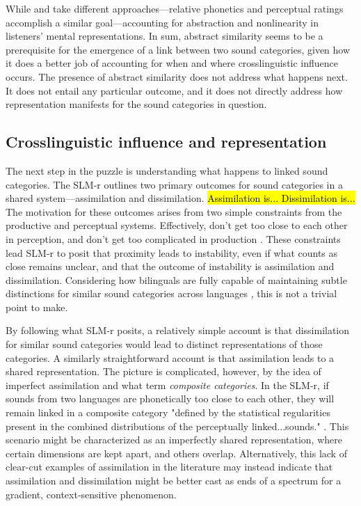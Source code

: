 While \citet{flege_2021_slmr} and \citet{chang_2015_similarity} take different approaches---relative phonetics and perceptual ratings accomplish a similar goal---accounting for abstraction and nonlinearity in listeners' mental representations. In sum, abstract similarity seems to be a prerequisite for the emergence of a link between two sound categories, given how it does a better job of accounting for when and where crosslinguistic influence occurs. The presence of abstract similarity does not address what happens next. It does not entail any particular outcome, and it does not directly address how representation manifests for the sound categories in question. 

\subsection{Crosslinguistic influence and representation}\label{ch4:sec:cli}

The next step in the puzzle is understanding what happens to linked sound categories. The SLM-r outlines two primary outcomes for sound categories in a shared system---assimilation and dissimilation. \hl{Assimilation is... Dissimilation is...} The motivation for these outcomes arises from two simple constraints from the productive and perceptual systems. Effectively, don't get too close to each other in perception, and don't get too complicated in production \citep{guion_2003_systems, lindblom_1988_universals, flege_2021_slmr}. These constraints lead SLM-r to posit that proximity leads to instability, even if what counts as close remains unclear, and that the outcome of instability is assimilation and dissimilation. Considering how bilinguals are fully capable of maintaining subtle distinctions for similar sound categories across languages \citep[e.g.,][]{sundara_2006_production, casillas_2021_interlingual}, this is not a trivial point to make. %

By following what SLM-r posits, a relatively simple account is that dissimilation for similar sound categories would lead to distinct representations of those categories. A similarly straightforward account is that assimilation leads to a shared representation. The picture is complicated, however, by the idea of imperfect assimilation and what \citeauthor{flege_2021_slmr} term \textit{composite categories}. In the SLM-r, if sounds from two languages are phonetically too close to each other, they will remain linked in a composite category "defined by the statistical regularities present in the combined distributions of the perceptually linked...sounds." \citep[][p. 41]{flege_2021_slmr}. This scenario might be characterized as an imperfectly shared representation, where certain dimensions are kept apart, and others overlap. Alternatively, this lack of clear-cut examples of assimilation in the literature may instead indicate that assimilation and dissimilation might be better cast as ends of a spectrum for a gradient, context-sensitive phenomenon. 

